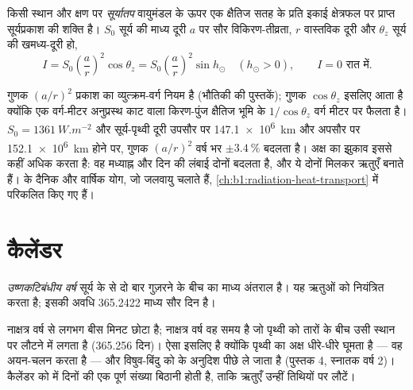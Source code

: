 \begin{definition}[सूर्यातप]\label{def:b1:spherical-astronomy:insolation}
किसी स्थान और क्षण पर \emph{सूर्यातप} वायुमंडल के ऊपर एक क्षैतिज सतह के प्रति
इकाई क्षेत्रफल पर प्राप्त सूर्यप्रकाश की शक्ति है। $S_0$ सूर्य की माध्य दूरी $a$ पर सौर
विकिरण-तीव्रता, $r$ वास्तविक दूरी और $\theta_z$ सूर्य की खमध्य-दूरी हो,
\[
  I = S_0\left(\frac{a}{r}\right)^{2}\cos\theta_z = S_0\left(\frac{a}{r}\right)^{2}\sin h_\odot
  \quad (h_\odot > 0), \qquad I = 0 \text{ रात में}.
\]
\end{definition}

गुणक $(a/r)^2$ प्रकाश का व्युत्क्रम-वर्ग नियम है (भौतिकी की पुस्तकें); गुणक $\cos\theta_z$ इसलिए
आता है क्योंकि एक वर्ग-मीटर अनुप्रस्थ काट वाला किरण-पुंज क्षैतिज भूमि के $1/\cos\theta_z$ वर्ग
मीटर पर फैलता है। $S_0 = \qty{1361}{W.m^{-2}}$ और सूर्य-पृथ्वी दूरी उपसौर पर
\qty{147.1e6}{km} और अपसौर पर \qty{152.1e6}{km} होने पर, गुणक $(a/r)^2$ वर्ष भर
$\pm\qty{3.4}{\percent}$ बदलता है। अक्ष का झुकाव इससे कहीं अधिक करता है: वह मध्याह्न 
और दिन की लंबाई दोनों बदलता है, और ये दोनों मिलकर ऋतुएँ बनाते हैं।  के दैनिक और
वार्षिक योग, जो जलवायु चलाते हैं, \cref{ch:b1:radiation-heat-transport} में परिकलित किए गए हैं।


\section{कैलेंडर}

\begin{definition}[उष्णकटिबंधीय वर्ष]\label{def:b1:spherical-astronomy:tropical-year}
\emph{उष्णकटिबंधीय वर्ष} सूर्य के  से दो बार गुज़रने
के बीच का माध्य अंतराल है। यह ऋतुओं को नियंत्रित करता है; इसकी अवधि 365.2422 माध्य सौर
दिन है।
\end{definition}

 नाक्षत्र वर्ष से लगभग बीस मिनट छोटा है; नाक्षत्र वर्ष वह समय है जो पृथ्वी को
तारों के बीच उसी स्थान पर लौटने में लगता है (365.256 दिन)। ऐसा इसलिए है क्योंकि पृथ्वी का
अक्ष धीरे-धीरे घूमता है --- वह अयन-चलन करता है --- और विषुव-बिंदु को  के अनुदिश
पीछे ले जाता है (पुस्तक 4, स्नातक वर्ष 2)। कैलेंडर को  में दिनों की एक पूर्ण
संख्या बिठानी होती है, ताकि ऋतुएँ उन्हीं तिथियों पर लौटें।

